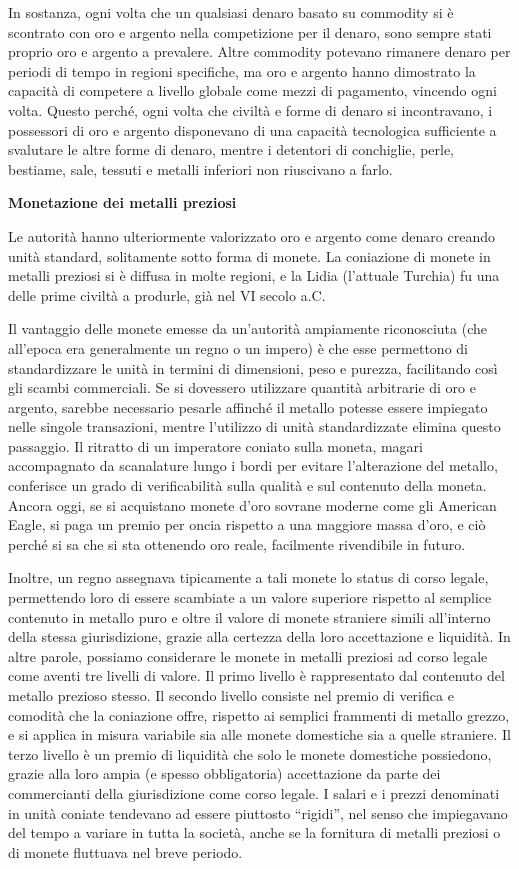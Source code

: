 \documentclass[
  a5paper,
  smalldemyvopaper,10pt,twoside,onecolumn,openright,extrafontsizes,hidelinks]{memoir}
\begin{document}
In sostanza, ogni volta che un qualsiasi denaro basato su commodity si è
scontrato con oro e argento nella competizione per il denaro, sono
sempre stati proprio oro e argento a prevalere. Altre commodity potevano
rimanere denaro per periodi di tempo in regioni specifiche, ma oro e
argento hanno dimostrato la capacità di competere a livello globale come
mezzi di pagamento, vincendo ogni volta. Questo perché, ogni volta che
civiltà e forme di denaro si incontravano, i possessori di oro e argento
disponevano di una capacità tecnologica sufficiente a svalutare le altre
forme di denaro, mentre i detentori di conchiglie, perle, bestiame,
sale, tessuti e metalli inferiori non riuscivano a farlo.

\textbf{Monetazione dei metalli preziosi}

Le autorità hanno ulteriormente valorizzato oro e argento come denaro
creando unità standard, solitamente sotto forma di monete. La coniazione
di monete in metalli preziosi si è diffusa in molte regioni, e la Lidia
(l'attuale Turchia) fu una delle prime civiltà a produrle, già nel VI
secolo a.C.

Il vantaggio delle monete emesse da un'autorità ampiamente riconosciuta
(che all'epoca era generalmente un regno o un impero) è che esse
permettono di standardizzare le unità in termini di dimensioni, peso e
purezza, facilitando così gli scambi commerciali. Se si dovessero
utilizzare quantità arbitrarie di oro e argento, sarebbe necessario
pesarle affinché il metallo potesse essere impiegato nelle singole
transazioni, mentre l'utilizzo di unità standardizzate elimina questo
passaggio. Il ritratto di un imperatore coniato sulla moneta, magari
accompagnato da scanalature lungo i bordi per evitare l'alterazione del
metallo, conferisce un grado di verificabilità sulla qualità e sul
contenuto della moneta. Ancora oggi, se si acquistano monete d'oro
sovrane moderne come gli American Eagle, si paga un premio per oncia
rispetto a una maggiore massa d'oro, e ciò perché si sa che si sta
ottenendo oro reale, facilmente rivendibile in futuro.

Inoltre, un regno assegnava tipicamente a tali monete lo status di corso
legale, permettendo loro di essere scambiate a un valore superiore
rispetto al semplice contenuto in metallo puro e oltre il valore di
monete straniere simili all'interno della stessa giurisdizione, grazie
alla certezza della loro accettazione e liquidità. In altre parole,
possiamo considerare le monete in metalli preziosi ad corso legale come
aventi tre livelli di valore. Il primo livello è rappresentato dal
contenuto del metallo prezioso stesso. Il secondo livello consiste nel
premio di verifica e comodità che la coniazione offre, rispetto ai
semplici frammenti di metallo grezzo, e si applica in misura variabile
sia alle monete domestiche sia a quelle straniere. Il terzo livello è un
premio di liquidità che solo le monete domestiche possiedono, grazie
alla loro ampia (e spesso obbligatoria) accettazione da parte dei
commercianti della giurisdizione come corso legale. I salari e i prezzi
denominati in unità coniate tendevano ad essere piuttosto ``rigidi'',
nel senso che impiegavano del tempo a variare in tutta la società, anche
se la fornitura di metalli preziosi o di monete fluttuava nel breve
periodo.
\end{document}
